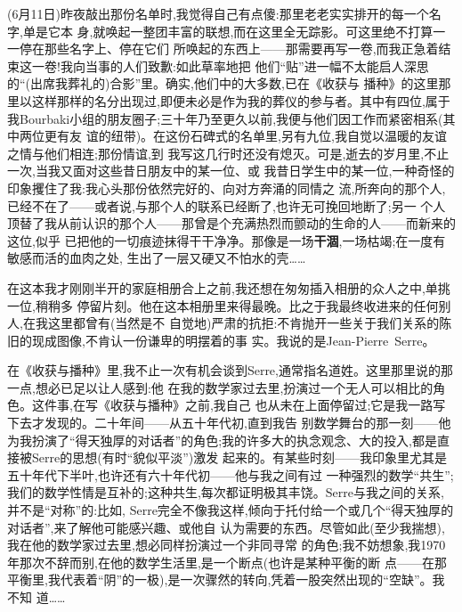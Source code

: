 (6月11日)昨夜敲出那份名单时,我觉得自己有点傻:那里老老实实排开的每一个名字,单是它本
身,就唤起一整团丰富的联想,而在这里全无踪影。可这里绝不打算一一停在那些名字上、停在它们
所唤起的东西上——那需要再写一卷,而我正急着结束\dmark{}这一卷!我向当事的人们致歉:如此草率地把
他们“贴”进一幅不太能启人深思的“(出席我葬礼的)合影”里。确实,他们中的大多数,已在《收获与
播种》的这里那里以这样那样的名分出现过,即便未必是作为我的葬仪的参与者。其中有四位,属于
我Bourbaki小组的朋友圈子;三十年乃至更久以前,我便与他们因工作而紧密相系(其中两位更有友
谊的纽带)。在这份石碑式的名单里,另有九位,我自觉以温暖的友谊之情与他们相连;那份情谊,到
我写这几行时还没有熄灭。可是,逝去的岁月里,不止一次,当我又面对这些昔日朋友中的某一位、或
我昔日学生中的某一位,一种奇怪的印象攫住了我:我心头那份依然完好的、向对方奔涌的同情之
流,所奔向的那个人,已经不在了——或者说,与那个人的联系已经断了,也许无可挽回地断了;另一
个人顶替了我从前认识的那个人——那曾是个充满热烈而颤动的生命的人——而新来的这位,似乎
已把他的一切痕迹抹得干干净净。那像是一场\textbf{干涸},一场枯竭;在一度有敏感而活的血肉之处,
生出了一层又硬又不怕水的壳……

在这本我才刚刚半开的家庭相册合上之前,我还想在匆匆插入相册的众人之中,单挑一位,稍稍多
停留片刻。他在这本相册里来得最晚。比之于我最终收进来的任何别人,在我这里都曾有(当然是不
自觉地)严肃的抗拒:不肯抛开一些关于我们关系的陈旧的现成图像,不肯认一份谦卑的明摆着的事
实。我说的是Jean-Pierre~Serre。

在《收获与播种》里,我不止一次有机会谈到Serre,通常指名道姓。这里那里说的那一点,想必已足以让人感到:他
在我的数学家过去里,扮演过一个无人可以相比的角色。这件事,在写\dmark{}《收获与播种》之前,我自己
也从未在上面停留过;它是我一路写下去才发现的。二十年间——从五十年代初,直到我告
别数学舞台的那一刻——他为我扮演了“得天独厚的对话者”的角色;我的许多大的执念观念、大的投入,都是直接被Serre的思想(有时“貌似平淡”)激发
起来的。有某些时刻——我印象里尤其是五十年代下半叶,也许还有六十年代初——他与我之间有过
一种强烈的数学“共生”;我们的数学性情是互补的;这种共生,每次都证明极其丰饶。Serre与我之间的关系,并不是“对称”的:比如,
Serre完全不像我这样,倾向于托付给一个或几个“得天独厚的对话者”,来了解他可能感兴趣、或他自
认为需要的东西。尽管如此(至少我揣想),我在他的数学家过去里,想必同样扮演过一个非同寻常
的角色;我不妨想象,我1970年那次不辞而别,在他的数学生活里,是一个断点(也许是某种平衡的断
点——在那平衡里,我代表着“阴”的一极),是一次骤然的转向,凭着一股突然出现的“空缺”。我不知
道……

